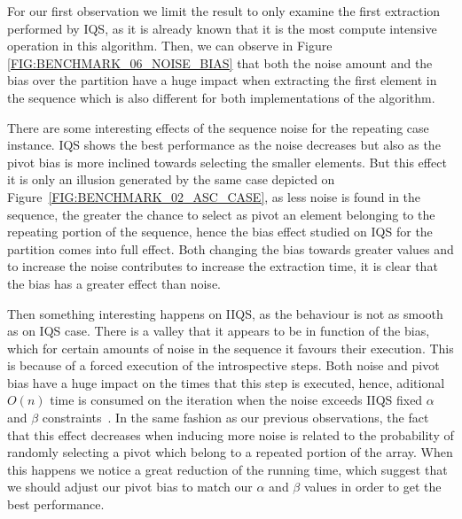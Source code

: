 For our first observation we limit the result to only examine the first extraction performed by IQS, as it is already known that it is the most compute intensive operation in this algorithm. Then, we can observe in Figure \ref{FIG:BENCHMARK_06_NOISE_BIAS} that both the noise amount and the bias over the partition have a huge impact when extracting the first element in the sequence which is also different for both implementations of the algorithm.

There are some interesting effects of the sequence noise for the repeating case instance. IQS shows the best performance as the noise decreases but also as the pivot bias is more inclined towards selecting the smaller elements. But this effect it is only an illusion generated by the same case depicted on Figure~\ref{FIG:BENCHMARK_02_ASC_CASE}, as less noise is found in the sequence, the greater the chance to select as pivot an element belonging to the repeating portion of the sequence, hence the bias effect studied on IQS for the partition comes into full effect. Both changing the bias towards greater values and to increase the noise contributes to increase the extraction time, it is clear that the bias has a greater effect than noise. 

Then something interesting happens on IIQS, as the behaviour is not as smooth as on IQS case. There is a valley that it appears to be in function of the bias, which for certain amounts of noise in the sequence it favours their execution. This is because of a forced execution of the introspective steps. Both noise and pivot bias have a huge impact on the times that this step is executed, hence, aditional $O(n)$ time is consumed on the iteration when the noise exceeds IIQS fixed $\alpha$ and $\beta$ constraints~\cite{7416566}. In the same fashion as our previous observations, the fact that this effect decreases when inducing more noise is related to the probability of randomly selecting a pivot which belong to a repeated portion of the array. When this happens we notice a great reduction of the running time, which suggest that we should adjust our pivot bias to match our $\alpha$ and $\beta$ values in order to get the best performance.

